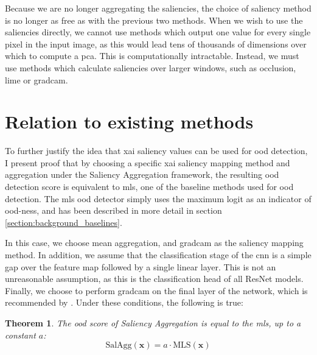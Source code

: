 \documentclass[UKenglish]{uiomasterthesis} %
\newtheorem{theorem}{Theorem}
\theoremstyle{definition}
\begin{document}
Because we are no longer aggregating the saliencies, the choice of saliency method is no longer as free as with the previous two methods. When we wish to use the saliencies directly, we cannot use methods which output one value for every single pixel in the input image, as this would lead tens of thousands of dimensions over which to compute a \acf{pca}. This is computationally intractable. Instead, we must use methods which calculate saliencies over larger windows, such as occlusion, \ac{lime} or \ac{gradcam}.

\section{Relation to existing methods} \label{section:relation}

To further justify the idea that \ac{xai} saliency values can be used for \ac{ood} detection, I present proof that by choosing a specific \ac{xai} saliency mapping method and aggregation under the Saliency Aggregation framework, the resulting \ac{ood} detection score is equivalent to \ac{mls}, one of the baseline methods used for \ac{ood} detection. The \ac{mls} \ac{ood} detector simply uses the maximum logit as an indicator of \ac{ood}-ness, and has been described in more detail in section \ref{section:background_baselines}.

In this case, we choose mean aggregation, and \ac{gradcam} as the saliency mapping method. In addition, we assume that the classification stage of the \ac{cnn} is a simple \ac{gap} over the feature map followed by a single linear layer. This is not an unreasonable assumption, as this is the classification head of all ResNet models. Finally, we choose to perform \ac{gradcam} on the final layer of the network, which is recommended by \cite{gradcam}. Under these conditions, the following is true:

\begin{theorem} \label{theorem}
The \ac{ood} score of Saliency Aggregation is equal to the \ac{mls}, up to a constant $a$:
\[\text{SalAgg}(\bm{x}) = a \cdot \text{MLS}(\bm{x}) \]
\end{theorem}
\end{document}
